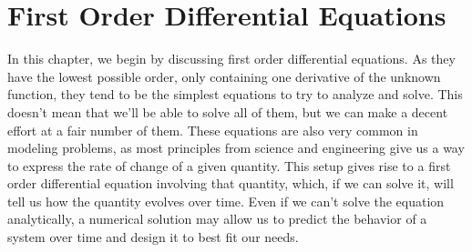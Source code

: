 \chapter{First Order Differential Equations} \label{fo:chapter}
\renewcommand{\thesection}{\thechapter.\the\value{section}}

In this chapter, we begin by discussing first order differential equations. As they have the lowest possible order, only containing one derivative of the unknown function, they tend to be the simplest equations to try to analyze and solve. This doesn't mean that we'll be able to solve all of them, but we can make a decent effort at a fair number of them. These equations are also very common in modeling problems, as most principles from science and engineering give us a way to express the rate of change of a given quantity. This setup gives rise to a first order differential equation involving that quantity, which, if we can solve it, will tell us how the quantity evolves over time. Even if we can't solve the equation analytically, a numerical solution may allow us to predict the behavior of a system over time and design it to best fit our needs. 




\sectionnewpage


\sectionnewpage


\sectionnewpage


\sectionnewpage


\sectionnewpage


\sectionnewpage


\sectionnewpage


\sectionnewpage


\sectionnewpage


\sectionnewpage


\sectionnewpage


% 

% 

